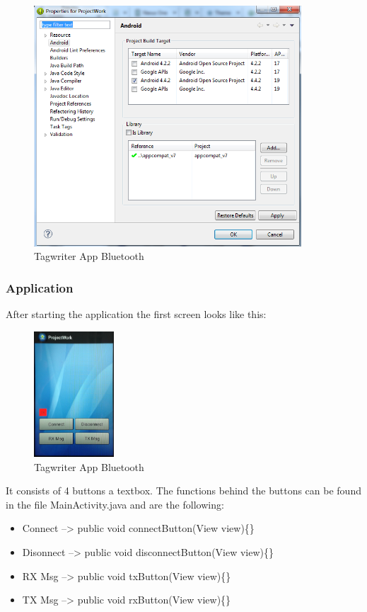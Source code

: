 \documentclass[11pt]{article}
\begin{document}
\begin{figure}[H]

 \centering
 \includegraphics [width=10cm]{properties.png} 
 \caption{Tagwriter App Bluetooth}
\end{figure}

\newpage

\subsubsection{Application}

After starting the application the first screen looks like this:

\begin{figure}[H]

 \centering
 \includegraphics [width=3cm]{startscreen.png} 
 \caption{Tagwriter App Bluetooth}
\end{figure}

It consists of 4 buttons a textbox. The functions behind the buttons can be found in the file MainActivity.java and are the following:

\begin{itemize} 
\item Connect --> public void connectButton(View view)\{\}
\item Disonnect --> public void disconnectButton(View view)\{\}
\item RX Msg --> public void txButton(View view)\{\}
\item TX Msg --> public void rxButton(View view)\{\}
\end{itemize} 
\end{document}
